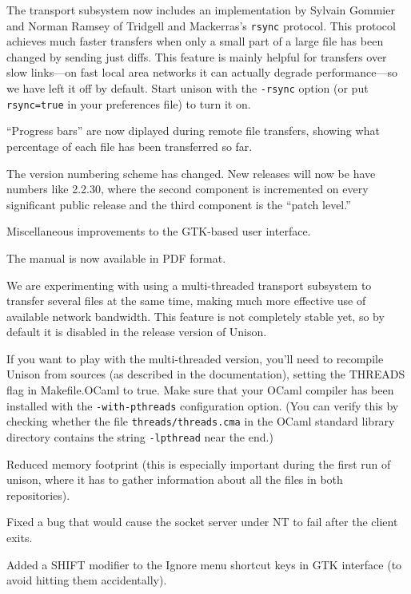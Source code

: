 \begin{changesfromversion}{2.1}
\item The transport subsystem now includes an implementation by
Sylvain Gommier and Norman Ramsey of Tridgell and Mackerras's
\verb|rsync| protocol.  This protocol achieves much faster 
transfers when only a small part of a large file has been changed by
sending just diffs.  This feature is mainly helpful for transfers over
slow links---on fast local area networks it can actually degrade
performance---so we have left it off by default.  Start unison with
the \verb|-rsync| option (or put \verb|rsync=true| in your preferences
file) to turn it on.

\item ``Progress bars'' are now diplayed during remote file transfers,
showing what percentage of each file has been transferred so far.

\item The version numbering scheme has changed.  New releases will now
      be have numbers like 2.2.30, where the second component is
      incremented on every significant public release and the third
      component is the ``patch level.''

\item Miscellaneous improvements to the GTK-based user interface.
\item The manual  is now available in PDF format.

\item We are experimenting with using a multi-threaded transport
subsystem to transfer several files at the same time, making
much more effective use of available network bandwidth.  This feature
is not completely stable yet, so by default it is disabled in the
release version of Unison.

If you want to play with the multi-threaded version, you'll need to
recompile Unison from sources (as described in the documentation),
setting the THREADS flag in Makefile.OCaml to true.  Make sure that
your OCaml compiler has been installed with the \verb|-with-pthreads|
configuration option.  (You can verify this by checking whether the
file \verb|threads/threads.cma| in the OCaml standard library
directory contains the string \verb|-lpthread| near the end.)
\end{changesfromversion}

\begin{changesfromversion}{1.292}
\item Reduced memory footprint (this is especially important during
the first run of unison, where it has to gather information about all
the files in both repositories). 
\item Fixed a bug that would cause the socket server under NT to fail
  after the client exits. 
\item Added a SHIFT modifier to the Ignore menu shortcut keys in GTK
  interface (to avoid hitting them accidentally).  
\end{changesfromversion}

